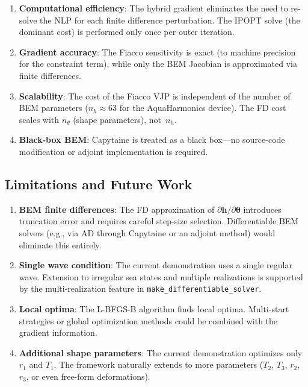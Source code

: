 \documentclass[11pt,a4paper]{article}
\newcommand{\bh}{\bm{h}}
\newcommand{\btheta}{\bm{\theta}}
\begin{document}
\begin{enumerate}
    \item \textbf{Computational efficiency}: The hybrid gradient
          eliminates the need to re-solve the NLP for each finite
          difference perturbation.  The IPOPT solve (the dominant
          cost) is performed only once per outer iteration.
    \item \textbf{Gradient accuracy}: The Fiacco sensitivity is
          exact (to machine precision for the constraint term), while
          only the BEM Jacobian is approximated via finite differences.
    \item \textbf{Scalability}: The cost of the Fiacco VJP is
          independent of the number of BEM parameters ($n_h \approx 63$
          for the AquaHarmonics device).  The FD cost scales with
          $n_\theta$ (shape parameters), not~$n_h$.
    \item \textbf{Black-box BEM}: Capytaine is treated as a black
          box---no source-code modification or adjoint implementation
          is required.
\end{enumerate}

\subsection{Limitations and Future Work}

\begin{enumerate}
    \item \textbf{BEM finite differences}: The FD approximation of
          $\partial \bh / \partial \btheta$ introduces truncation error
          and requires careful step-size selection.  Differentiable
          BEM solvers (e.g., via AD through Capytaine or an adjoint
          method) would eliminate this entirely.
    \item \textbf{Single wave condition}: The current demonstration
          uses a single regular wave.  Extension to irregular sea
          states and multiple realizations is supported by the
          multi-realization feature in
          \texttt{make\_differentiable\_solver}.
    \item \textbf{Local optima}: The L-BFGS-B algorithm finds local
          optima.  Multi-start strategies or global optimization
          methods could be combined with the gradient information.
    \item \textbf{Additional shape parameters}: The current
          demonstration optimizes only $r_1$ and $T_1$.  The
          framework naturally extends to more parameters ($T_2$, $T_3$,
          $r_2$, $r_3$, or even free-form deformations).
\end{enumerate}
\end{document}
